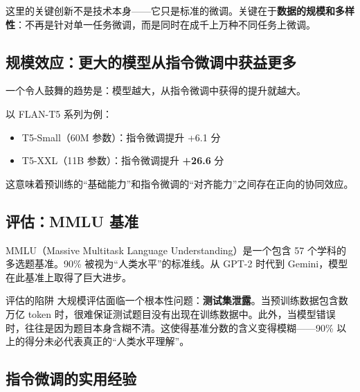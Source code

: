 \documentclass[a4paper]{article}
\begin{document}
这里的关键创新不是技术本身——它只是标准的微调。关键在于\textbf{数据的规模和多样性}：不再是针对单一任务微调，而是同时在成千上万种不同任务上微调。





\subsection{规模效应：更大的模型从指令微调中获益更多}

一个令人鼓舞的趋势是：模型越大，从指令微调中获得的提升就越大。





以 FLAN-T5 系列为例：
\begin{itemize}
    \item T5-Small（60M 参数）：指令微调提升 +6.1 分
    \item T5-XXL（11B 参数）：指令微调提升 \textbf{+26.6} 分
\end{itemize}

这意味着预训练的``基础能力''和指令微调的``对齐能力''之间存在正向的协同效应。





\subsection{评估：MMLU 基准}





MMLU（Massive Multitask Language Understanding）是一个包含 57 个学科的多选题基准。90\% 被视为``人类水平''的标准线。从 GPT-2 时代到 Gemini，模型在此基准上取得了巨大进步。

\begin{warningbox}{评估的陷阱}
大规模评估面临一个根本性问题：\textbf{测试集泄露}。当预训练数据包含数万亿 token 时，很难保证测试题目没有出现在训练数据中。此外，当模型错误时，往往是因为题目本身含糊不清。这使得基准分数的含义变得模糊——90\% 以上的得分未必代表真正的``人类水平理解''。
\end{warningbox}

\subsection{指令微调的实用经验}
\end{document}
